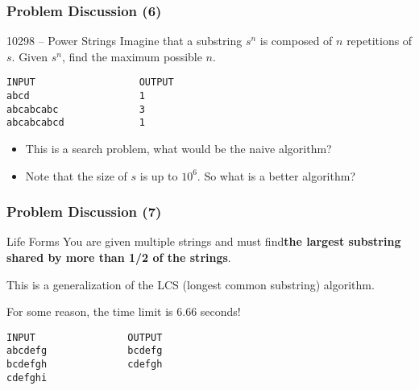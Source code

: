 \begin{frame}[fragile]
  \frametitle{Problem Discussion (6)}

  {\small
    \begin{exampleblock}{10298 -- Power Strings}
      Imagine that a substring $s^n$ is composed of $n$ repetitions of $s$.
      Given $s^n$, find the maximum possible $n$.

      \bigskip

\begin{verbatim}
INPUT                  OUTPUT
abcd                   1
abcabcabc              3
abcabcabcd             1
\end{verbatim}
    \end{exampleblock}

    \vfill
    
    \begin{itemize}
    \item This is a search problem, what would be the naive algorithm?
    \item Note that the size of $s$ is up to $10^6$. So what is a better algorithm?
    \end{itemize}
    
  }
\end{frame}

\begin{frame}[fragile]
  \frametitle{Problem Discussion (7)}

  {\small
    \begin{block}{Life Forms}
      You are given multiple strings and must find{\bf the largest
        substring shared by more than 1/2 of the strings}.

      \medskip

      This is a generalization of the LCS (longest common substring)
      algorithm.

      \medskip

      For some reason, the time limit is 6.66 seconds!
      
    \end{block}

\begin{verbatim}
INPUT                OUTPUT
abcdefg              bcdefg
bcdefgh              cdefgh
cdefghi
\end{verbatim}
    
  }
\end{frame}



